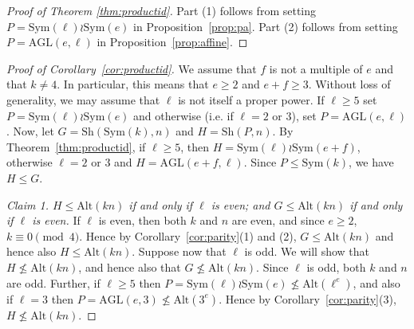 \documentclass[12pt]{amsart}
\theoremstyle{remark}
\theoremstyle{definition}
\newcounter{claim}[thm]
\newcommand{\sym}{\mathrm{Sym}}
\newcommand{\alt}{\mathrm{Alt}}
\newcommand{\sh}{\mathrm{Sh}}
\newcommand{\AGL}{\mathrm{AGL}}
\begin{document}
\begin{proof}[Proof of Theorem \ref{thm:productid}]
Part (1) follows from setting $P= \sym(\ell) \wr \sym(e)$ in Proposition~\ref{prop:pa}. Part (2) follows from setting $P = \AGL(e, \ell)$ in Proposition~\ref{prop:affine}.
\end{proof}

\begin{proof}[Proof of Corollary~\ref{cor:productid}]
We assume that $f$ is not a multiple of $e$ and that $k\neq 4$. In particular, this means that $e \geqslant 2$ and $e+f \geqslant 3$. Without loss of generality, we may assume that $\ell$ is not itself a proper power.  If $\ell \geqslant 5$ set $P=\sym(\ell)\wr\sym(e)$  and otherwise (i.e. if $\ell=2$ or $3$), set $P = \AGL(e,\ell)$.  Now, let $G = \sh(\sym(k),n)$    and $H = \sh(P, n)$. By Theorem~\ref{thm:productid}, if $\ell \geqslant 5$, then $H = \sym(\ell)\wr\sym(e+f)$, otherwise $\ell=2$ or $3$ and  $H = \AGL(e+f,\ell)$. Since $P \leqslant\sym(k)$, we have $H \leqslant G$.

\smallskip\noindent
\emph{Claim 1. $H \leqslant \alt(kn)$ if and only if $\ell$ is even; and $G\leqslant \alt(kn)$ if and only if $\ell$ is even.} \quad
If $\ell$ is even, then both $k$ and $n$ are even, and since $e \geqslant 2$, $k \equiv 0 \pmod{4}$. Hence by Corollary~\ref{cor:parity}(1) and (2),
 $G \leqslant \alt(kn)$ and hence also $H \leqslant \alt(kn)$.
Suppose now that $\ell$ is odd. We will show that $H \nleqslant \alt(kn)$, and hence also that $G \nleqslant \alt(kn)$. Since $\ell$ is odd, both $k$ and $n$ are odd. Further, if $\ell \geqslant 5$ then $P=\sym(\ell)\wr\sym(e)\not\leqslant \alt(\ell^e)$, and also if $\ell=3$ then $P= \AGL(e,3) \nleqslant \alt(3^e)$. Hence by Corollary~\ref{cor:parity}(3), $H \nleqslant \alt(kn)$.


\end{proof}
\end{document}
